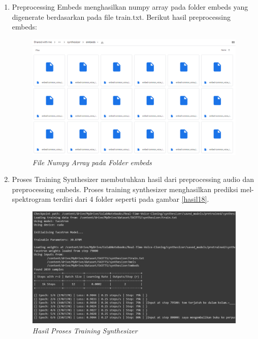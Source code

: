 \begin{enumerate}
\item Preprocessing Embeds menghasilkan numpy array pada folder embeds yang digenerate berdasarkan pada file train.txt. Berikut hasil preprocessing embeds:
\begin{figure}[H]
    \centering
    \includegraphics[scale=0.35]{figures/hasil16}
    \caption{\textit{File Numpy Array pada Folder embeds}}
    \label{hasil16}
\end{figure}

\item Proses Training Synthesizer membutuhkan hasil dari preprocessing audio dan preprocessing embeds. Proses training synthesizer menghasilkan prediksi mel-spektrogram terdiri dari 4 folder seperti pada gambar \ref{hasil18}. 
\begin{figure}[H]
    \centering
    \includegraphics[scale=0.4]{figures/hasil17}
    \caption{\textit{Hasil Proses Training Synthesizer}}
    \label{hasil17}
\end{figure}


\end{enumerate}
